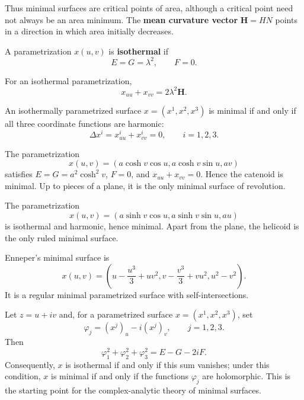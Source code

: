 \documentclass[12pt, oneside]{book}
\begin{document}
Thus minimal surfaces are critical points of area, although a critical point
need not always be an area minimum.  The \textbf{mean curvature vector}
$\mathbf H=HN$ points in a direction in which area initially decreases.

\begin{definition}
    A parametrization $x(u,v)$ is \textbf{isothermal} if
    \[
        E=G=\lambda^2,
        \qquad F=0.
    \]
\end{definition}

\begin{proposition}
    For an isothermal parametrization,
    \[
        x_{uu}+x_{vv}=2\lambda^2\mathbf H.
    \]
\end{proposition}

\begin{corollary}
    An isothermally parametrized surface
    $x=(x^1,x^2,x^3)$ is minimal if and only if all three coordinate
    functions are harmonic:
    \[
        \Delta x^i=x^i_{uu}+x^i_{vv}=0,
        \qquad i=1,2,3.
    \]
\end{corollary}

\begin{example}[Catenoid]
    The parametrization
    \[
        x(u,v)=(a\cosh v\cos u,a\cosh v\sin u,av)
    \]
    satisfies $E=G=a^2\cosh^2v$, $F=0$, and
    $x_{uu}+x_{vv}=0$.  Hence the catenoid is minimal.  Up to pieces of a
    plane, it is the only minimal surface of revolution.
\end{example}

\begin{example}[Helicoid]
    The parametrization
    \[
        x(u,v)=(a\sinh v\cos u,a\sinh v\sin u,au)
    \]
    is isothermal and harmonic, hence minimal.  Apart from the plane, the
    helicoid is the only ruled minimal surface.
\end{example}

\begin{example}
    Enneper's minimal surface is
    \[
        x(u,v)=\left(
        u-\frac{u^3}{3}+uv^2,
        v-\frac{v^3}{3}+vu^2,
        u^2-v^2\right).
    \]
    It is a regular minimal parametrized surface with self-intersections.
\end{example}

Let $z=u+iv$ and, for a parametrized surface
$x=(x^1,x^2,x^3)$, set
\[
    \varphi_j=(x^j)_u-i(x^j)_v,
    \qquad j=1,2,3.
\]
Then
\[
    \varphi_1^2+\varphi_2^2+\varphi_3^2=E-G-2iF.
\]
Consequently, $x$ is isothermal if and only if this sum vanishes; under this
condition, $x$ is minimal if and only if the functions $\varphi_j$ are
holomorphic.  This is the starting point for the complex-analytic theory of
minimal surfaces.
\end{document}
